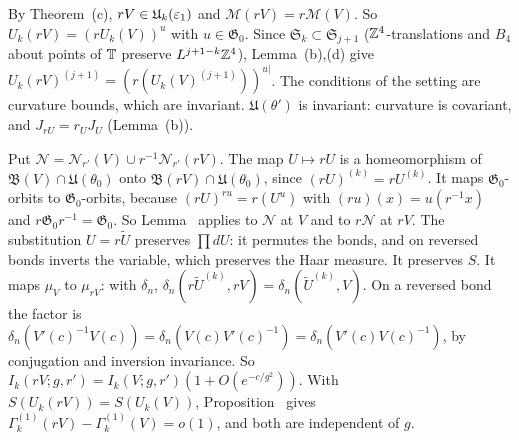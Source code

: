 \begin{detail}\label{d11a:B4}
\begin{step}
By Theorem~(c), $rV\in\mathfrak U_k(\varepsilon_1)$ and $\mathscr M(rV)=r\mathscr M(V)$. So $U_k(rV)=(rU_k(V))^u$ with $u\in\mathfrak G_0$. Since $\mathfrak S_k\subset\mathfrak S_{j+1}$ ($\mathbb Z^4$-translations and $B_4$ about points of $\mathbb T$ preserve $L^{j+1-k}\mathbb Z^4$), Lemma~(b),(d) give $U_k(rV)^{(j+1)}=(r(U_k(V)^{(j+1)}))^{u|}$. The conditions of the setting are curvature bounds, which are invariant. $\mathfrak U(\theta')$ is invariant: curvature is covariant, and $J_{rU}=r_UJ_U$ (Lemma~(b)).
\end{step}
\begin{step}
Put $\mathscr N=\mathscr N_{r'}(V)\cup r^{-1}\mathscr N_{r'}(rV)$. The map $U\mapsto rU$ is a homeomorphism of $\mathfrak B(V)\cap\mathfrak U(\theta_0)$ onto $\mathfrak B(rV)\cap\mathfrak U(\theta_0)$, since $(rU)^{(k)}=rU^{(k)}$. It maps $\mathfrak G_0$-orbits to $\mathfrak G_0$-orbits, because $(rU)^{ru}=r(U^u)$ with $(ru)(x)=u(r^{-1}x)$ and $r\mathfrak G_0r^{-1}=\mathfrak G_0$. So Lemma~ applies to $\mathscr N$ at $V$ and to $r\mathscr N$ at $rV$. The substitution $U=r\tilde U$ preserves $\prod dU$: it permutes the bonds, and on reversed bonds inverts the variable, which preserves the Haar measure. It preserves $S$. It maps $\mu_V$ to $\mu_{rV}$: with $\delta_n$, $\delta_n(r\tilde U^{(k)},rV)=\delta_n(\tilde U^{(k)},V)$. On a reversed bond the factor is $\delta_n(V'(c)^{-1}V(c))=\delta_n(V(c)V'(c)^{-1})=\delta_n(V'(c)V(c)^{-1})$, by conjugation and inversion invariance. So $I_k(rV;g,r')=I_k(V;g,r')(1+O(e^{-c/g^2}))$. With $S(U_k(rV))=S(U_k(V))$, Proposition~ gives $\Gamma^{(1)}_k(rV)-\Gamma^{(1)}_k(V)=o(1)$, and both are independent of $g$.
\end{step}
\end{detail}

